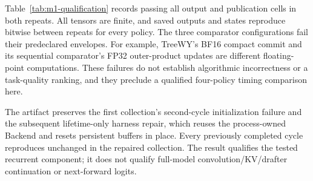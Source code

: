 Table~\ref{tab:m1-qualification} records \sys{} passing all output and publication cells in both repeats. All tensors are finite, and saved outputs and states reproduce bitwise between repeats for every policy. The three comparator configurations fail their predeclared envelopes. For example, TreeWY's BF16 compact commit and its sequential comparator's FP32 outer-product updates are different floating-point computations. These failures do not establish algorithmic incorrectness or a task-quality ranking, and they preclude a qualified four-policy timing comparison here.

The artifact preserves the first collection's second-cycle initialization failure and the subsequent lifetime-only harness repair, which reuses the process-owned Backend and resets persistent buffers in place. Every previously completed cycle reproduces unchanged in the repaired collection. The result qualifies the tested recurrent component; it does not qualify full-model convolution/KV/drafter continuation or next-forward logits.
